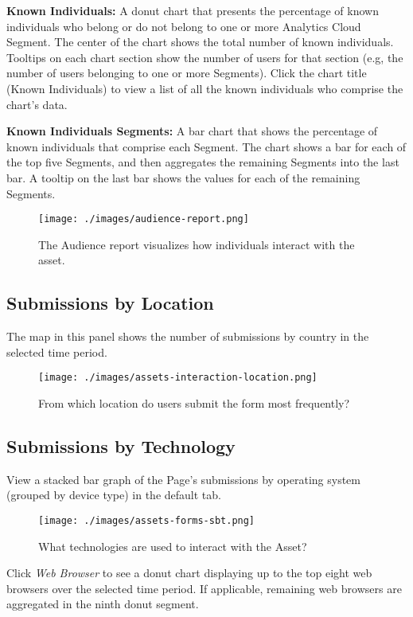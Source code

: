 \textbf{Known Individuals:} A donut chart that presents the percentage
of known individuals who belong or do not belong to one or more
Analytics Cloud Segment. The center of the chart shows the total number
of known individuals. Tooltips on each chart section show the number of
users for that section (e.g, the number of users belonging to one or
more Segments). Click the chart title (Known Individuals) to view a list
of all the known individuals who comprise the chart's data.

\textbf{Known Individuals Segments:} A bar chart that shows the
percentage of known individuals that comprise each Segment. The chart
shows a bar for each of the top five Segments, and then aggregates the
remaining Segments into the last bar. A tooltip on the last bar shows
the values for each of the remaining Segments.

\begin{figure}
\centering
\texttt{[image: ./images/audience-report.png]}
\caption{The Audience report visualizes how individuals interact with
the asset.}
\end{figure}

\subsection{Submissions by Location}\label{submissions-by-location}

The map in this panel shows the number of submissions by country in the
selected time period.

\begin{figure}
\centering
\texttt{[image: ./images/assets-interaction-location.png]}
\caption{From which location do users submit the form most frequently?}
\end{figure}

\subsection{Submissions by Technology}\label{submissions-by-technology}

View a stacked bar graph of the Page's submissions by operating system
(grouped by device type) in the default tab.

\begin{figure}
\centering
\texttt{[image: ./images/assets-forms-sbt.png]}
\caption{What technologies are used to interact with the Asset?}
\end{figure}

Click \emph{Web Browser} to see a donut chart displaying up to the top
eight web browsers over the selected time period. If applicable,
remaining web browsers are aggregated in the ninth donut segment.


